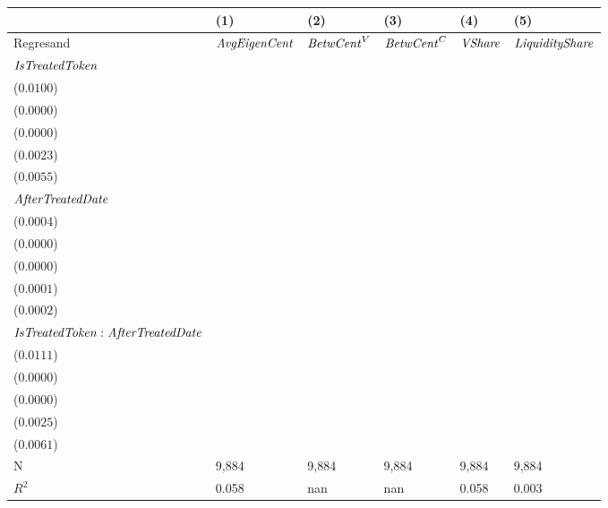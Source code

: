 \begin{tabular}{llllll}
\toprule
{} &                                      (1) &                                   (2) &                                   (3) &                                      (4) &                                      (5) \\
\midrule
Regresand                                     &                     ${\it AvgEigenCent}$ &                    ${\it BetwCent}^V$ &                    ${\it BetwCent}^C$ &                           ${\it VShare}$ &                   ${\it LiquidityShare}$ \\
${\it IsTreatedToken}$                        &     \makecell{$0.0000^{}$ \\ ($0.0100$)} &  \makecell{$0.0000^{}$ \\ ($0.0000$)} &  \makecell{$0.0000^{}$ \\ ($0.0000$)} &     \makecell{$0.0000^{}$ \\ ($0.0023$)} &    \makecell{$0.0107^{*}$ \\ ($0.0055$)} \\
${\it AfterTreatedDate}$                      &  \makecell{$0.0048^{***}$ \\ ($0.0004$)} &  \makecell{$0.0000^{}$ \\ ($0.0000$)} &  \makecell{$0.0000^{}$ \\ ($0.0000$)} &  \makecell{$0.0012^{***}$ \\ ($0.0001$)} &  \makecell{$0.0007^{***}$ \\ ($0.0002$)} \\
${\it IsTreatedToken}:{\it AfterTreatedDate}$ &  \makecell{$0.0940^{***}$ \\ ($0.0111$)} &  \makecell{$0.0000^{}$ \\ ($0.0000$)} &  \makecell{$0.0000^{}$ \\ ($0.0000$)} &  \makecell{$0.0211^{***}$ \\ ($0.0025$)} &    \makecell{$-0.0021^{}$ \\ ($0.0061$)} \\
\midrule N                                    &                                    9,884 &                                 9,884 &                                 9,884 &                                    9,884 &                                    9,884 \\
$R^2$                                         &                                    0.058 &                                   nan &                                   nan &                                    0.058 &                                    0.003 \\
\bottomrule
\end{tabular}
